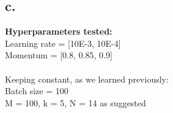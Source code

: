 \documentclass{article}
\newcommand{\1}{\mathbf{1}}
\begin{document}
{\begin{figure}[h]
  \centering
\end{figure}

\subsection*{c.}

\textbf{Hyperparameters tested:} \\
Learning rate = [10E-3, 10E-4] \\
Momentum = [0.8, 0.85, 0.9] \\ \\ 
Keeping constant, as we learned previously: \\
Batch size = 100 \\
M = 100, k = 5, N = 14 as suggested \\



}
\end{document}
